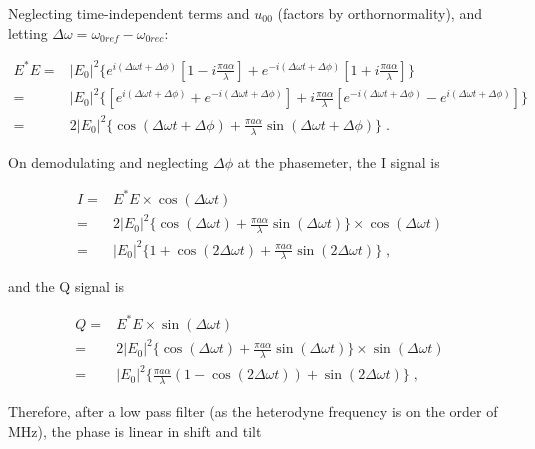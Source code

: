 \documentclass[aps,twoside,secnumarabic,balancelastpage,amsmath,amssymb,nofootinbib,hyperref=pdftex]{revtex4}
\begin{document}
Neglecting time-independent terms and $u_{00}$ (factors by orthornormality), and letting $\Delta \omega = \omega_{0 ref}-\omega_{0 rec}$:

\begin{align}
	E^{*}E =& 
		|E_{0}|^2 
		\lbrace
       			e^{i  (\Delta \omega t + \Delta \phi) }
				\left[
					1 - i\frac{\pi a \alpha }{\lambda}
				\right]
			+
			e^{-i  (\Delta \omega t + \Delta \phi) }
				\left[
					1 + i\frac{\pi a \alpha }{\lambda}
				\right]
		\rbrace 
		\;
		\nonumber \\
		=& 
		|E_{0}|^2
		\lbrace
			\left[
			e^{i  (\Delta \omega t + \Delta \phi) }
			+
			e^{-i  (\Delta \omega t + \Delta \phi) }
			\right]
		+
		i\frac{\pi a \alpha }{\lambda}
			\left[
			e^{-i  (\Delta \omega t + \Delta \phi) }
			-
			e^{i  (\Delta \omega t + \Delta \phi) }
			\right]
		\rbrace 
		\nonumber \\
		=&
		2|E_{0}|^2
		\lbrace
			\cos (\Delta \omega t + \Delta \phi)
			+
			\frac{\pi a \alpha }{\lambda}
			\sin (\Delta \omega t + \Delta \phi)
		\rbrace		\; .
\end{align}

On demodulating and neglecting $\Delta \phi$ at the phasemeter, the I signal is

\begin{align}
		I
	=& 
	E^{*}E \times \cos (\Delta \omega t)
	\nonumber \\
	=& 
		2|E_{0}|^2
		\lbrace
			\cos (\Delta \omega t)
			+
			\frac{\pi a \alpha }{\lambda}
			\sin (\Delta \omega t)
		\rbrace	
		\times 
		\cos (\Delta \omega t)
		\nonumber \\
	=& 
		|E_{0}|^2		
		\lbrace
			1+
			\cos (2 \Delta \omega t)
			+
			\frac{\pi a \alpha }{\lambda}
			\sin (2 \Delta \omega t)
		\rbrace 
		\; ,	
\end{align}

and the Q signal is

\begin{align}
	Q
	=& 
	E^{*}E \times \sin (\Delta \omega t)
	\nonumber \\
	=& 
		2|E_{0}|^2
		\lbrace
			\cos (\Delta \omega t)
			+
			\frac{\pi a \alpha }{\lambda}
			\sin (\Delta \omega t)
		\rbrace	
		\times 
		\sin (\Delta \omega t)
		\nonumber \\
	=& 
		|E_{0}|^2		
		\lbrace
			\frac{\pi a \alpha }{\lambda}
			(			
			1-
			\cos (2 \Delta \omega t)
			)
			+
			\sin (2 \Delta \omega t)
		\rbrace	\; ,
\end{align}

Therefore, after a low pass filter (as the heterodyne frequency is on the order of MHz), the phase is linear in shift and tilt
\end{document}

